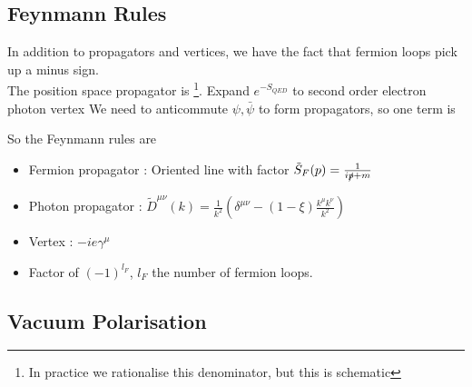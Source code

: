 \documentclass{article}
\begin{document}
\subsection{Feynmann Rules}
In addition to propagators and vertices, we have the fact that fermion loops pick up a minus sign. \\
The position space propagator is 
\footnote{In practice we rationalise this denominator, but this is schematic}. Expand $e^{-S_{QED}}$ to second order electron photon vertex
We need to anticommute $\psi,\bar{\psi}$ to form propagators, so one term is 

So the Feynmann rules are 
\begin{itemize}
    \item Fermion propagator : Oriented line with factor $\tilde{S}_F(p) = \frac{1}{i\slashed{p}+m}$ 
    \item Photon propagator : $\tilde{D}^{\mu\nu}(k) = \frac{1}{k^2} \left( \delta^{\mu\nu} - (1-\xi) \frac{k^\mu k^\nu}{k^2} \right)$
    \item Vertex : $-ie \gamma^\mu $
    \item Factor of $(-1)^{l_F}$, $l_F$ the number of fermion loops. 
\end{itemize}

\subsection{Vacuum Polarisation}
\end{document}
